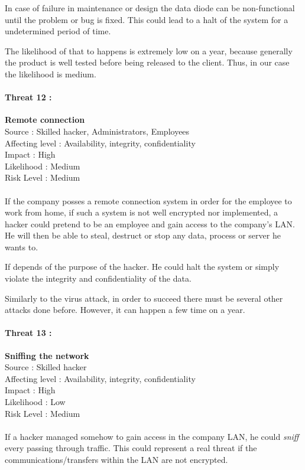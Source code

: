 \documentclass[a4paper,10pt]{article}
\begin{document}
In case of failure in maintenance or design the data diode can be non-functional until the problem or bug is fixed. This could lead to a halt of the system for a undetermined period of time.

The likelihood of that to happens is extremely low on a year, because generally the product is well tested before being released to the client. Thus, in our case the likelihood is medium.  \\

\paragraph{Threat 12 :}  \textbf{Remote connection} \\ 
Source : Skilled hacker, Administrators, Employees \\ 
Affecting level : Availability, integrity, confidentiality \\
Impact : High \\
Likelihood : Medium \\
Risk Level : Medium
\paragraph{}If the company posses a remote connection system in order for the employee to work from home, if such a system is not well encrypted nor implemented, a hacker could pretend to be an employee and gain access to the company's LAN. He will then be able to steal, destruct or stop any data, process or server he wants to.

If depends of the purpose of the hacker. He could halt the system or simply violate the integrity and confidentiality of the data. 

Similarly to the virus attack, in order to succeed there must be several other attacks done before. However, it can happen a few time on a year.  \\

\paragraph{Threat 13 :}  \textbf{Sniffing the network} \\ 
Source : Skilled hacker \\ 
Affecting level : Availability, integrity, confidentiality \\
Impact : High \\
Likelihood : Low \\
Risk Level : Medium
\paragraph{}If a hacker managed somehow to gain access in the company LAN, he could \emph{sniff} every passing through traffic. This could represent a real threat if the communications/transfers within the LAN are not encrypted.
\end{document}
